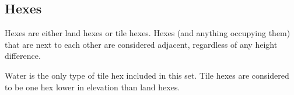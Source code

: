 \documentclass[../main.tex]{subfiles}
\begin{document}
\subsection{Hexes}
Hexes are either land hexes or tile hexes. Hexes (and anything occupying them) that are next to each other are considered adjacent, regardless of any height difference. 

Water is the only type of tile hex included in this set. Tile hexes are considered to be one hex lower in elevation than land hexes. 
\end{document}
